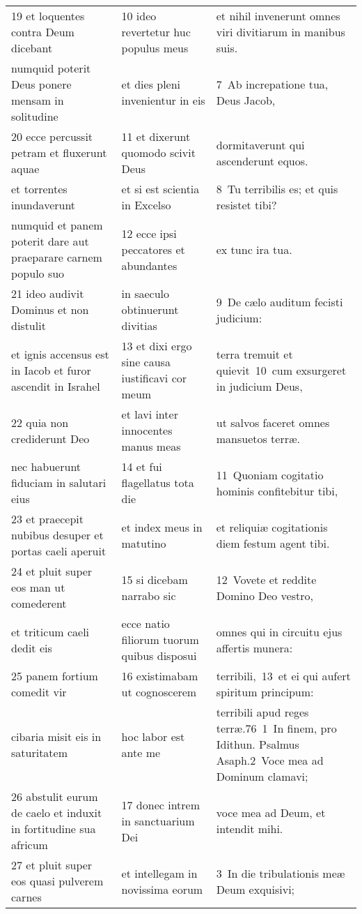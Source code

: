 \documentclass{article}
\begin{document}
\begin{longtable}{@{}p{}p{}p{}@{}}
19 et loquentes contra Deum dicebant	&	10 ideo revertetur huc populus meus	&	et nihil invenerunt omnes viri divitiarum in manibus suis.	\\
numquid poterit Deus ponere mensam in solitudine	&	et dies pleni invenientur in eis	&	7 Ab increpatione tua, Deus Jacob,	\\
20 ecce percussit petram et fluxerunt aquae	&	11 et dixerunt quomodo scivit Deus	&	dormitaverunt qui ascenderunt equos.	\\
et torrentes inundaverunt	&	et si est scientia in Excelso	&	8 Tu terribilis es; et quis resistet tibi?	\\
numquid et panem poterit dare aut praeparare carnem populo suo	&	12 ecce ipsi peccatores et abundantes	&	ex tunc ira tua.	\\
21 ideo audivit Dominus et non distulit	&	in saeculo obtinuerunt divitias	&	9 De cælo auditum fecisti judicium:	\\
et ignis accensus est in Iacob et furor ascendit in Israhel	&	13 et dixi ergo sine causa iustificavi cor meum	&	terra tremuit et quievit 10 cum exsurgeret in judicium Deus,	\\
22 quia non crediderunt Deo	&	et lavi inter innocentes manus meas	&	ut salvos faceret omnes mansuetos terræ.	\\
nec habuerunt fiduciam in salutari eius	&	14 et fui flagellatus tota die	&	11 Quoniam cogitatio hominis confitebitur tibi,	\\
23 et praecepit nubibus desuper et portas caeli aperuit	&	et index meus in matutino	&	et reliquiæ cogitationis diem festum agent tibi.	\\
24 et pluit super eos man ut comederent	&	15 si dicebam narrabo sic	&	12 Vovete et reddite Domino Deo vestro,	\\
et triticum caeli dedit eis	&	ecce natio filiorum tuorum quibus disposui	&	omnes qui in circuitu ejus affertis munera:	\\
25 panem fortium comedit vir	&	16 existimabam ut cognoscerem	&	terribili, 13 et ei qui aufert spiritum principum:	\\
cibaria misit eis in saturitatem	&	hoc labor est ante me	&	terribili apud reges terræ.76 1 In finem, pro Idithun. Psalmus Asaph.2 Voce mea ad Dominum clamavi;	\\
26 abstulit eurum de caelo et induxit in fortitudine sua africum	&	17 donec intrem in sanctuarium Dei	&	voce mea ad Deum, et intendit mihi.	\\
27 et pluit super eos quasi pulverem carnes	&	et intellegam in novissima eorum	&	3 In die tribulationis meæ Deum exquisivi;	\\

\end{longtable}
\end{document}
